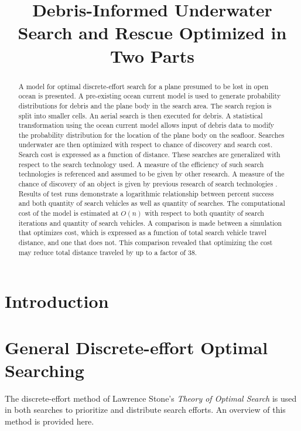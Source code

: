 \documentclass[a4paper]{article}
\title{Debris-Informed Underwater Search and Rescue Optimized in Two Parts}
\author{}
\date{}
\begin{document}
\maketitle

\begin{abstract}
A model for optimal discrete-effort search for a plane presumed to be lost in open ocean is presented. A pre-existing ocean current model is used to generate probability distributions for debris and the plane body in the search area. The search region is split into smaller cells. An aerial search is then executed for debris. A statistical transformation using the ocean current model allows input of debris data to modify the probability distribution for the location of the plane body on the seafloor. Searches underwater are then optimized with respect to chance of discovery and search cost. Search cost is expressed as a function of distance. These searches are generalized with respect to the search technology used. A measure of the efficiency of such search technologies is referenced and assumed to be given by other research. A measure of the chance of discovery of an object is given by previous research of search technologies . Results of test runs demonstrate a logarithmic relationship between percent success and both quantity of search vehicles as well as quantity of searches. The computational cost of the model is estimated at $O(n)$ with respect to both quantity of search iterations and quantity of search vehicles. A comparison is made between a simulation that optimizes cost, which is expressed as a function of total search vehicle travel distance, and one that does not. This comparison revealed that optimizing the cost may reduce total distance traveled by up to a factor of 38.
\end{abstract}

\pagebreak 

\section{Introduction}


\section{General Discrete-effort Optimal Searching}

The discrete-effort method of Lawrence Stone's \textit{Theory of Optimal Search} is used in both searches to prioritize and distribute search efforts. An overview of this method is provided here. 
\end{document}
